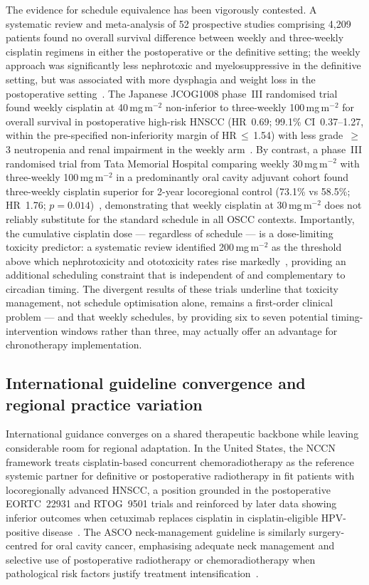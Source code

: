 \documentclass[preprint,review,12pt]{elsarticle}
\begin{document}
The evidence for schedule equivalence has been vigorously contested. A
systematic review and meta-analysis of 52 prospective studies comprising
4,209 patients found no overall survival difference between weekly and
three-weekly cisplatin regimens in either the postoperative or the definitive
setting; the weekly approach was significantly less nephrotoxic and
myelosuppressive in the definitive setting, but was associated with more
dysphagia and weight loss in the postoperative setting~\cite{Szturz2017}.
The Japanese JCOG1008 phase~III randomised trial found weekly cisplatin at
40\,mg\,m$^{-2}$ non-inferior to three-weekly 100\,mg\,m$^{-2}$ for overall
survival in postoperative high-risk HNSCC (HR~0.69; 99.1\% CI~0.37--1.27,
within the pre-specified non-inferiority margin of HR\,$\leq$\,1.54) with
less grade~$\geq$3 neutropenia and renal impairment in the weekly
arm~\cite{Kiyota2022}. By contrast, a phase~III randomised trial from Tata
Memorial Hospital comparing weekly 30\,mg\,m$^{-2}$ with three-weekly
100\,mg\,m$^{-2}$ in a predominantly oral cavity adjuvant cohort found
three-weekly cisplatin superior for 2-year locoregional control
(73.1\% vs 58.5\%; HR~1.76; $p = 0.014$)~\cite{Noronha2018}, demonstrating
that weekly cisplatin at 30\,mg\,m$^{-2}$ does not reliably substitute for
the standard schedule in all OSCC contexts. Importantly, the cumulative
cisplatin dose --- regardless of schedule --- is a dose-limiting toxicity
predictor: a systematic review identified 200\,mg\,m$^{-2}$ as the
threshold above which nephrotoxicity and ototoxicity rates rise
markedly~\cite{Strojan2016}, providing an additional scheduling constraint
that is independent of and complementary to circadian timing.  The divergent
results of these trials underline that toxicity management, not schedule
optimisation alone, remains a first-order clinical problem --- and that
weekly schedules, by providing six to seven potential timing-intervention
windows rather than three, may actually offer an advantage for chronotherapy
implementation.

\subsection{International guideline convergence and regional practice variation}

International guidance converges on a shared therapeutic backbone while
leaving considerable room for regional adaptation.  In the United States,
the NCCN framework treats cisplatin-based concurrent chemoradiotherapy as
the reference systemic partner for definitive or postoperative radiotherapy
in fit patients with locoregionally advanced HNSCC, a position grounded in
the postoperative EORTC~22931 and RTOG~9501 trials and reinforced by later
data showing inferior outcomes when cetuximab replaces cisplatin in
cisplatin-eligible HPV-positive disease~\cite{Caudell2022, Bernier2004,
Cooper2004, Gillison2019, Mehanna2019}.  The ASCO neck-management guideline
is similarly surgery-centred for oral cavity cancer, emphasising adequate
neck management and selective use of postoperative radiotherapy or
chemoradiotherapy when pathological risk factors justify treatment
intensification~\cite{Koyfman2019}.
\end{document}
